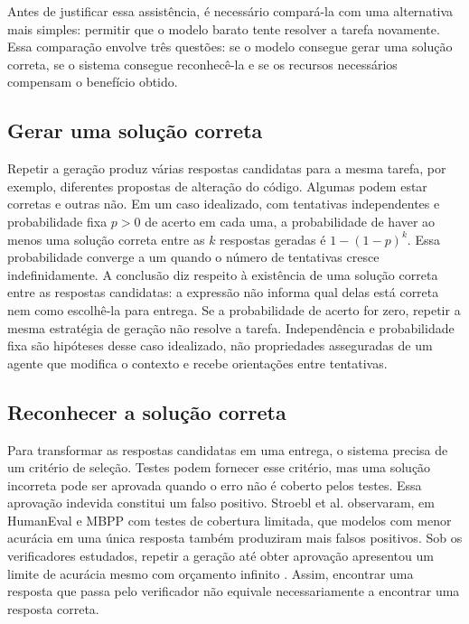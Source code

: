 Antes de justificar essa assistência, é necessário compará-la com uma alternativa mais simples: permitir que o modelo barato tente resolver a tarefa novamente. Essa comparação envolve três questões: se o modelo consegue gerar uma solução correta, se o sistema consegue reconhecê-la e se os recursos necessários compensam o benefício obtido.

\subsection{Gerar uma solução correta}

Repetir a geração produz várias respostas candidatas para a mesma tarefa, por exemplo, diferentes propostas de alteração do código. Algumas podem estar corretas e outras não. Em um caso idealizado, com tentativas independentes e probabilidade fixa $p>0$ de acerto em cada uma, a probabilidade de haver ao menos uma solução correta entre as $k$ respostas geradas é $1-(1-p)^k$. Essa probabilidade converge a um quando o número de tentativas cresce indefinidamente. A conclusão diz respeito à existência de uma solução correta entre as respostas candidatas: a expressão não informa qual delas está correta nem como escolhê-la para entrega. Se a probabilidade de acerto for zero, repetir a mesma estratégia de geração não resolve a tarefa. Independência e probabilidade fixa são hipóteses desse caso idealizado, não propriedades asseguradas de um agente que modifica o contexto e recebe orientações entre tentativas.

\subsection{Reconhecer a solução correta}

Para transformar as respostas candidatas em uma entrega, o sistema precisa de um critério de seleção. Testes podem fornecer esse critério, mas uma solução incorreta pode ser aprovada quando o erro não é coberto pelos testes. Essa aprovação indevida constitui um falso positivo. Stroebl et al. observaram, em HumanEval e MBPP com testes de cobertura limitada, que modelos com menor acurácia em uma única resposta também produziram mais falsos positivos. Sob os verificadores estudados, repetir a geração até obter aprovação apresentou um limite de acurácia mesmo com orçamento infinito \cite{Stroebl2026Resampling}. Assim, encontrar uma resposta que passa pelo verificador não equivale necessariamente a encontrar uma resposta correta.

